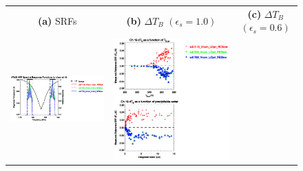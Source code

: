 \begin{figure}[H]
  \centering
  \begin{tabular}{c c c}
    \textsf{\textbf{(a)} SRFs} &
    \textsf{\textbf{(b)} $\Delta T_B$ $(\epsilon_s = 1.0)$} &
    \textsf{\textbf{(c)} $\Delta T_B$ $(\epsilon_s = 0.6)$} \\
    \includegraphics[bb=80 400 280 558,clip,scale=0.85]{graphics/srf/Tset/atms_npp.ch19.osrf.eps} &
    \includegraphics[bb=85 400 260 558,clip,scale=0.85]{graphics/dtb/Tset/e1.0_r0.0/atms_npp.ch19.dTb.eps} & 

\end{tabular}
\end{figure}
